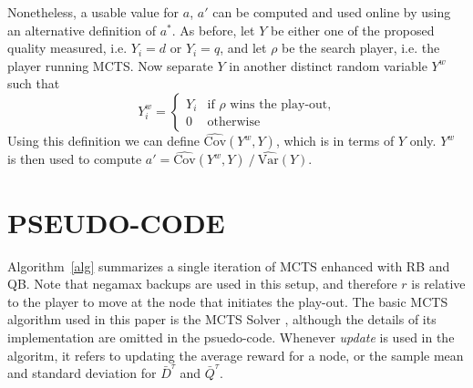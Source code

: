 \documentclass{ecai2014}
\newcommand{\SVar}[1]{\mathrm{\widehat{Var}}\left( #1 \right)}
\newcommand{\SCov}[1]{\mathrm{\widehat{Cov}}\left( #1 \right)}
\begin{document}
Nonetheless, a usable value for $a$, $a'$ can be computed and used online by using an alternative definition of $a^*$. As before, let $Y$ be either one of the proposed quality measured, i.e. $Y_i=d$ or $Y_i=q$, and let $\rho$ be the search player, i.e. the player running MCTS. Now separate $Y$ in another distinct random variable $Y^w$ such that
\begin{equation}
Y^w_i =
\begin{cases}
   Y_i & \text{if $\rho$ wins the play-out,} \\
   0   & \text{otherwise}
\end{cases}
\label{eq:ywin}
\end{equation}
Using this definition we can define $\SCov{Y^w,Y}$, which is in terms of $Y$ only. $Y^w$ is then used to compute $a'={\SCov{Y^w,Y}}\mathbin{/}{\SVar{Y}}$.

\section{PSEUDO-CODE}
Algorithm~\ref{alg} summarizes a single iteration of MCTS enhanced with RB and QB. Note that negamax backups are used in this setup, and therefore $r$ is relative to the player to move at the node that initiates the play-out. The basic MCTS algorithm used in this paper is the MCTS Solver \cite{Winands2008}, although the details of its implementation are omitted in the psuedo-code. Whenever \emph{update} is used in the algoritm, it refers to updating the average reward for a node, or the sample mean and standard deviation for $\bar{D}^\tau$ and $\bar{Q}^\tau$.
\end{document}
